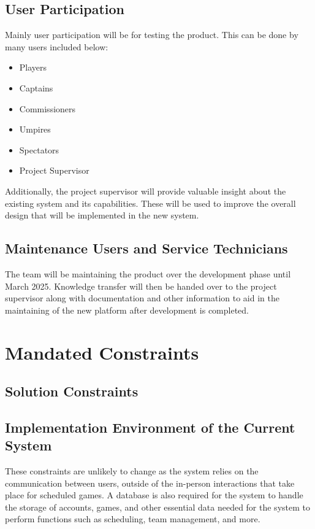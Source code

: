 \documentclass[12pt]{article}
\begin{document}
\subsection{User Participation}

Mainly user participation will be for testing the product. This can
be done by many users included below:

\begin{itemize}
  \item Players
  \item Captains
  \item Commissioners
  \item Umpires
  \item Spectators
  \item Project Supervisor
\end{itemize}

Additionally, the project supervisor will provide valuable
insight about the existing system and its capabilities. These
will be used to improve the overall design that will be implemented
in the new system.

\subsection{Maintenance Users and Service Technicians}

The team will be maintaining the product over the development phase until
March 2025. Knowledge transfer will then be handed over to the
project supervisor along with documentation and other information to aid
in the maintaining of the new platform after development is completed.

\section{Mandated Constraints}
\subsection{Solution Constraints}

\subsection{Implementation Environment of the Current System}

These constraints are unlikely to change as the system relies on the communication
between users, outside of the in-person interactions that take place for scheduled games. A database
is also required for the system to handle the storage of accounts, games, and
other essential data needed for the system to perform functions such as
scheduling, team management, and more.
\end{document}
